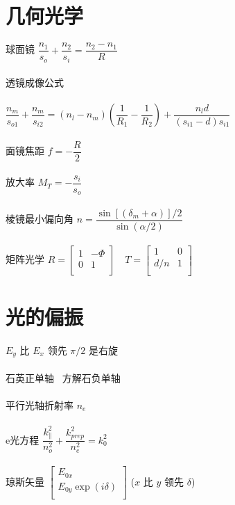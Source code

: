 \documentclass{article}
\begin{document}
\begin{multicols}{2}
\section{几何光学}

球面镜 $\dfrac{n_1}{s_o} + \dfrac{n_2}{s_i} = \dfrac{n_2 - n_1}{R}  $
\\\\
透镜成像公式
\\\\
$\dfrac{n_m}{s_{o1}} + \dfrac{n_m}{s_{i2}} = \left( n_l - n_m \right) \left( \dfrac{1}{R_1} - \dfrac{1}{R_2}   \right) + \dfrac{n_l d}{\left( s_{i1} - d \right)s_{i1}}   $
\\\\
面镜焦距 $f = - \dfrac{R}{2} $
\\\\
放大率 $M_T = - \dfrac{s_i}{s_o} $
\\\\
棱镜最小偏向角 $n = \dfrac{\sin \left[ \left( \delta_m + \alpha \right) \right] / 2}{\sin \left( \alpha / 2 \right)} $
\\\\
矩阵光学 $R = \left[
  \begin{array}{ccc}
   1 & - \Phi \\
   0 & 1 \\
  \end{array}
\right ]
\quad T = \left[
  \begin{array}{ccc}
   1 & 0 \\
   d/n & 1 \\
  \end{array}
\right ]
$

\section{光的偏振}

$E_y$ 比 $E_x$ 领先 $\pi/2$ 是右旋
\\\\
石英正单轴 \ 方解石负单轴
\\\\
平行光轴折射率 $n_e$
\\\\
e光方程 $\dfrac{k_{\parallel}^2}{n_o^2} + \dfrac{k_{prep}^2}{n_e^2} = k_0^2  $
\\\\
琼斯矢量 $\left[
  \begin{array}{cc}
   E_{0x} \\
   E_{0y} \exp \left( i \delta \right)  \\
  \end{array}
\right ]
$ ($x$ 比 $y$ 领先 $\delta$)


\end{multicols}
\end{document}
